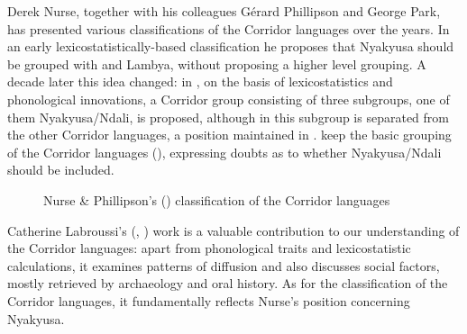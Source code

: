 Derek Nurse, together with his colleagues Gérard Phillipson and George Park, has presented various classifications of the Corridor languages over the years. In an early lexicostatistically-based classification \citep{NurseD1979} he proposes that Nyakyusa should be grouped with  and Lambya, without proposing a higher level grouping. A decade later this idea changed: in \citet{NurseD1988}, on the basis of lexicostatistics and phonological innovations, a Corridor group consisting of three subgroups, one of them Nyakyusa/Ndali, is proposed, although in \citet{NurseDParkG1988} this subgroup is separated from the other Corridor languages, a position maintained in \citet{NurseD1999}. \citet{NurseDPhillipsonG2003b} keep the basic grouping of the Corridor languages (), expressing doubts as to whether Nyakyusa/Ndali should be included.

\begin{figure}
\begin{center}
\caption{Nurse \& Phillipson's (\citeyear{NurseDPhillipsonG2003b}) classification of the Corridor languages}\label{ClassificationNursePhillipson2003}
\end{center}
\end{figure} 
Catherine Labroussi's (\citeyear{LabroussiC1998}, \citeyear{LabroussiC1999}) work is a valuable contribution to our understanding of the Corridor languages: apart from phonological traits and lexicostatistic calculations, it examines patterns of diffusion and also discusses social factors, mostly retrieved by archaeology and oral history. As for the classification of the Corridor languages, it fundamentally reflects Nurse's position concerning Nyakyusa.

